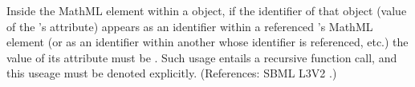Inside the  MathML element within a \FunctionDefinition
object, if the identifier of that object (\ie value of the
\FunctionDefinition's  attribute) appears as an identifier within a referenced \FunctionDefinition's  MathML element (or as an identifier within another \FunctionDefinition whose identifier is referenced, etc.) the value of its  attribute must be .  Such usage entails a recursive function call, and this useage must be denoted explicitly.  (References: SBML L3V2
.)
